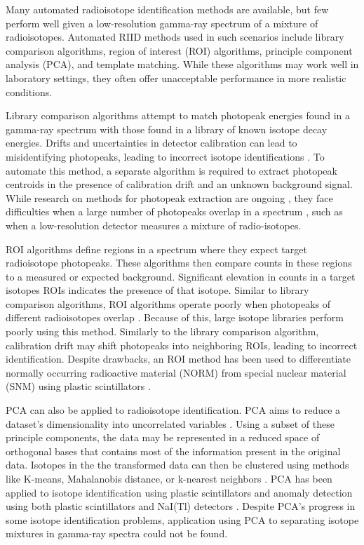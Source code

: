 Many automated radioisotope identification methods are available, but few perform well given a low-resolution gamma-ray spectrum of a mixture of radioisotopes. Automated RIID methods used in such scenarios include library comparison algorithms, region of interest (ROI) algorithms, principle component analysis (PCA), and template matching. While these algorithms may work well in laboratory settings, they often offer unacceptable performance in more realistic conditions.

Library comparison algorithms attempt to match photopeak energies found in a gamma-ray spectrum with those found in a library of known isotope decay energies. Drifts and uncertainties in detector calibration can lead to misidentifying photopeaks, leading to incorrect isotope identifications \cite{burr2009}. To automate this method, a separate algorithm is required to extract photopeak centroids in the presence of calibration drift and an unknown background signal. While research on methods for photopeak extraction are ongoing \cite{mariscotti1967,DELOTTO1977,GARDNER2011}, they face difficulties when a large number of photopeaks overlap in a spectrum \cite{xiong2015}, such as when a low-resolution detector measures a mixture of radio-isotopes.

ROI algorithms define regions in a spectrum where they expect target radioisotope photopeaks. These algorithms then compare counts in these regions to a measured or expected background. Significant elevation in counts in a target isotopes ROIs indicates the presence of that isotope. Similar to library comparison algorithms, ROI algorithms operate poorly when photopeaks of different radioisotopes overlap \cite{burr2009}. Because of this, large isotope libraries perform poorly using this method. Similarly to the library comparison algorithm, calibration drift may shift photopeaks into neighboring ROIs, leading to incorrect identification. Despite drawbacks, an ROI method has been used to differentiate normally occurring radioactive material (NORM) from special nuclear material (SNM) using plastic scintillators \cite{Ely2006}.

PCA can also be applied to radioisotope identification. PCA aims to reduce a dataset's dimensionality into uncorrelated variables \cite{Jolliffe2002}. Using a subset of these principle components, the data may be represented in a reduced space of orthogonal bases that contains most of the information present in the original data. Isotopes in the the transformed data can then be clustered using methods like K-means, Mahalanobis distance, or k-nearest neighbors \cite{Kanungo2002, Kumari2012}. PCA has been applied to isotope identification using plastic scintillators \cite{Boardman2012} and anomaly detection using both plastic scintillators and NaI(Tl) detectors \cite{runkle2006b}. Despite PCA's progress in some isotope identification problems, application using PCA to separating isotope mixtures in gamma-ray spectra could not be found.

